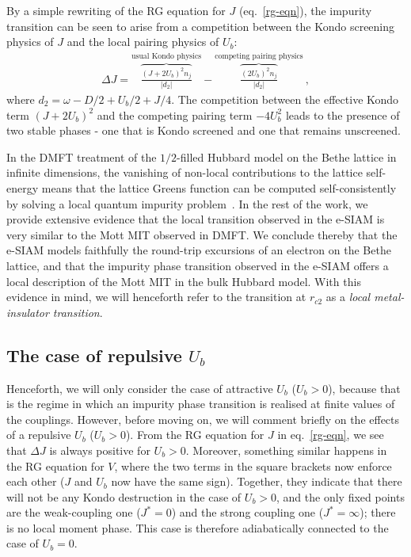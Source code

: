 \documentclass{iopart}
\begin{document}
By a simple rewriting of the RG equation for \(J\) (eq.~\eqref{rg-eqn}), the impurity transition can be seen to arise from a competition between the Kondo screening physics of \(J\) and the local pairing physics of \(U_b\):
\begin{eqnarray}
\Delta J = \overbrace{\frac{(J + 2U_b)^2 n_j}{|d_{2}|}}^\text{usual Kondo physics} - \overbrace{\frac{(2U_b)^2 n_j}{|d_{2}|}}^\text{competing pairing physics}~,
\end{eqnarray}
where $d_{2}=\omega - D/2 + U_b/2 + J/4$. The competition between the effective Kondo term \((J + 2U_b)^2\) and the competing pairing term \(-4U_b^2\) leads to the presence of two stable phases - one that is Kondo screened and one that remains unscreened.

In the DMFT treatment of the $1/2$-filled Hubbard model on the Bethe lattice in infinite dimensions, the vanishing of non-local contributions to the lattice self-energy means that the lattice Greens function can be computed self-consistently by solving a local quantum impurity problem~\cite{georges1996}. In the rest of the work, we provide extensive evidence that the local transition observed in the e-SIAM is very similar to the Mott MIT observed in DMFT. We conclude thereby that the e-SIAM models faithfully the round-trip excursions of an electron on the Bethe lattice, and that the impurity phase transition observed in the e-SIAM offers a local description of the Mott MIT in the bulk Hubbard model. With this evidence in mind, we will henceforth refer to the transition at \(r_{c2}\) as a {\it local metal-insulator transition}.


\subsection{The case of repulsive \(U_b\)}
Henceforth, we will only consider the case of attractive \(U_b\) (\(U_b > 0\)), because that is the regime in which an impurity phase transition is realised at finite values of the couplings. However, before moving on, we will comment briefly on the effects of a repulsive \(U_b\) (\(U_b > 0\)). From the RG equation for \(J\) in eq.~\ref{rg-eqn}, we see that \(\Delta J\) is always positive for \(U_b > 0\). Moreover, something similar happens in the RG equation for \(V\), where the two terms in the square brackets now enforce each other (\(J\) and \(U_b\) now have the same sign). Together, they indicate that there will not be any Kondo destruction in the case of \(U_b > 0\), and the only fixed points are the weak-coupling one (\(J^* = 0\)) and the strong coupling one (\(J^* = \infty\)); there is no local moment phase. This case is therefore adiabatically connected to the case of \(U_b = 0\).
\end{document}
